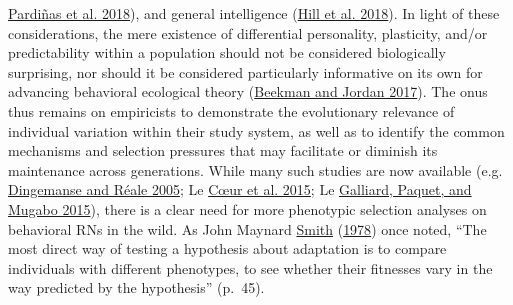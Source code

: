 \documentclass{article}
\begin{document}
\protect\hyperlink{ref-Pard2018}{Pardiñas et al. 2018}), and general
intelligence (\protect\hyperlink{ref-Hill2018}{Hill et al. 2018}). In
light of these considerations, the mere existence of differential
personality, plasticity, and/or predictability within a population
should not be considered biologically surprising, nor should it be
considered particularly informative on its own for advancing behavioral
ecological theory (\protect\hyperlink{ref-Beekman2017}{Beekman and
Jordan 2017}). The onus thus remains on empiricists to demonstrate the
evolutionary relevance of individual variation within their study
system, as well as to identify the common mechanisms and selection
pressures that may facilitate or diminish its maintenance across
generations. While many such studies are now available (e.g.
\protect\hyperlink{ref-Ding2005}{Dingemanse and Réale 2005}; Le
\protect\hyperlink{ref-LC2015}{Cœur et al. 2015}; Le
\protect\hyperlink{ref-Gall2015}{Galliard, Paquet, and Mugabo 2015}),
there is a clear need for more phenotypic selection analyses on
behavioral RNs in the wild. As John Maynard
\protect\hyperlink{ref-Smith1978}{Smith}
(\protect\hyperlink{ref-Smith1978}{1978}) once noted, ``The most direct
way of testing a hypothesis about adaptation is to compare individuals
with different phenotypes, to see whether their fitnesses vary in the
way predicted by the hypothesis'' (p.~45).
\end{document}
